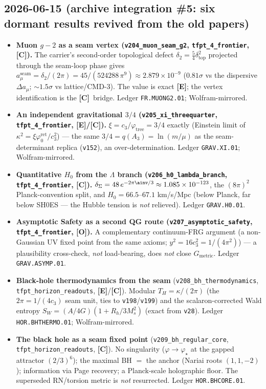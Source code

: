 \documentclass[11pt]{article}
\providecommand{\mE}{\textbf{[E]}}\providecommand{\mC}{\textbf{[C]}}
\providecommand{\mO}{\textbf{[O]}}\providecommand{\mX}{\textbf{[X]}}
\providecommand{\cthree}{c_3}\providecommand{\phiz}{\varphi_0^{\mathrm{ret}}}
\begin{document}
\subsection*{2026-06-15 (archive integration \#5: six dormant results revived from the old papers)}
\begin{itemize}
\item \textbf{Muon $g-2$ as a seam vertex (\texttt{v204\_muon\_seam\_g2}, \texttt{tfpt\_4\_frontier}, \mC).}
  The carrier's second-order topological defect $\delta_2=\tfrac54\delta_{\mathrm{top}}^2$ projected through the
  seam-loop phase gives $a_\mu^{\mathrm{seam}}=\delta_2/(2\pi)=45/(524288\,\pi^9)\approx2.879\times10^{-9}$
  ($0.81\sigma$ vs the dispersive $\Delta a_\mu$; ${\sim}1.5\sigma$ vs lattice/CMD-3). The value is exact \mE;
  the vertex identification is the \mC\ bridge. Ledger \texttt{FR.MUONG2.01}; Wolfram-mirrored.
\item \textbf{An independent gravitational $3/4$ (\texttt{v205\_xi\_threequarter}, \texttt{tfpt\_4\_frontier}, \mE/\mC).}
  $\xi=\cthree/\varphi_{\mathrm{tree}}=3/4$ exactly (Einstein limit of $\kappa^2=\xi\phiz/\cthree^2$) --- the
  same $3/4=q(A_3)=\ln(m/\mu)$ as the seam-determinant replica (\texttt{v152}), an over-determination. Ledger
  \texttt{GRAV.XI.01}; Wolfram-mirrored.
\item \textbf{Quantitative $H_0$ from the $\Lambda$ branch (\texttt{v206\_h0\_lambda\_branch}, \texttt{tfpt\_4\_frontier}, \mC).}
  $\delta_\Sigma=48\,e^{-2\pi\ainv/3}\approx1.085\times10^{-123}$, the $(8\pi)^2$ Planck-convention split, and
  $H_0=66.5$--$67.1$ km/s/Mpc (below Planck, far below SH0ES --- the Hubble tension is \emph{not} relieved).
  Ledger \texttt{GRAV.H0.01}.
\item \textbf{Asymptotic Safety as a second QG route (\texttt{v207\_asymptotic\_safety}, \texttt{tfpt\_4\_frontier}, \mO).}
  A complementary continuum-FRG argument (a non-Gaussian UV fixed point from the same axioms;
  $y^2=16\cthree^2=1/(4\pi^2)$) --- a plausibility cross-check, \emph{not} load-bearing, does \emph{not} close
  $G_{\mathrm{metric}}$. Ledger \texttt{GRAV.ASYMP.01}.
\item \textbf{Black-hole thermodynamics from the seam} (\texttt{v208\_bh\_\allowbreak thermodynamics},
  \texttt{tfpt\_horizon\_\allowbreak readouts}, \mE/\mC).
  Modular $T_H=\kappa/(2\pi)$ (the $2\pi=1/(4\cthree)$ seam unit, ties to \texttt{v198}/\texttt{v199}) and the
  scalaron-corrected Wald entropy $S_W=(A/4G)(1+R_h/3M_s^2)$ (exact from \texttt{v28}). Ledger
  \texttt{HOR.BHTHERMO.01}; Wolfram-mirrored.
\item \textbf{The black hole as a seam fixed point} (\texttt{v209\_bh\_\allowbreak regular\_core},
  \texttt{tfpt\_horizon\_\allowbreak readouts}, \mC).
  No singularity ($\varphi\to\varphi_\star$ at the gapped attractor $(2/3)^6$); the maximal BH $=$ the anchor
  (Nariai roots $(1,1,-2)$); information via Page recovery; a Planck-scale holographic floor. The superseded
  RN/torsion metric is \emph{not} resurrected. Ledger \texttt{HOR.BHCORE.01}.
\end{itemize}
\end{document}
